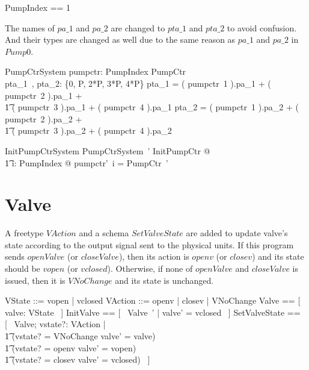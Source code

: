 \documentclass{report} %
\begin{document}
\begin{zed}
  PumpIndex == 1 
\end{zed}

The names of $pa\_1$ and $pa\_2$ are changed to $pta\_1$ and $pta\_2$ to avoid confusion. And their types are changed as well due to the same reason as $pa\_1$ and $pa\_2$ in $Pump0$.
\begin{schema}{PumpCtrSystem}
  pumpctr: PumpIndex \fun PumpCtr
  \\ %
  pta\_1~, pta\_2: \{0, P, 2*P, 3*P, 4*P\} 
  \where %
  pta\_1 =
    ( pumpctr~1 ).pa\_1 + ( pumpctr~2 ).pa\_1 +  %
    \\ \t1 %
    ( pumpctr~3 ).pa\_1 + ( pumpctr~4 ).pa\_1   %
  \also %
  pta\_2 =
    ( pumpctr~1 ).pa\_2 + ( pumpctr~2 ).pa\_2 +  %
    \\ \t1 %
    ( pumpctr~3 ).pa\_2 + ( pumpctr~4 ).pa\_2  %
\end{schema}

\begin{schema}{InitPumpCtrSystem}
  PumpCtrSystem~'
  \where %
  \exists InitPumpCtr @
  \\ %
  \t1 \forall i: PumpIndex @ pumpctr'~i = \theta PumpCtr~'
\end{schema}

\section{Valve}

A freetype $VAction$ and a schema $SetValveState$ are added to update valve's state according to the output signal sent to the physical units. If this program sends $openValve$ (or $closeValve$), then its action is $openv$ (or $closev$) and its state should be $vopen$ (or $vclosed$). Otherwise, if none of $openValve$ and $closeValve$ is issued, then it is $VNoChange$ and its state is unchanged.
\begin{zed}
  VState ::= vopen | vclosed
  \also %
  VAction ::= openv | closev | VNoChange 
  \also %
  Valve == [~ valve: VState ~]
  \also %
  InitValve == [~ Valve~' | valve' = vclosed ~]
  \also %
  SetValveState == [~ \Delta Valve; vstate?: VAction | \\
      \t1 (vstate? = VNoChange \implies valve' = valve) \land \\
      \t1 (vstate? = openv \implies valve' = vopen) \land \\
      \t1 (vstate? = closev \implies valve' = vclosed) ~]
\end{zed}
\end{document}
